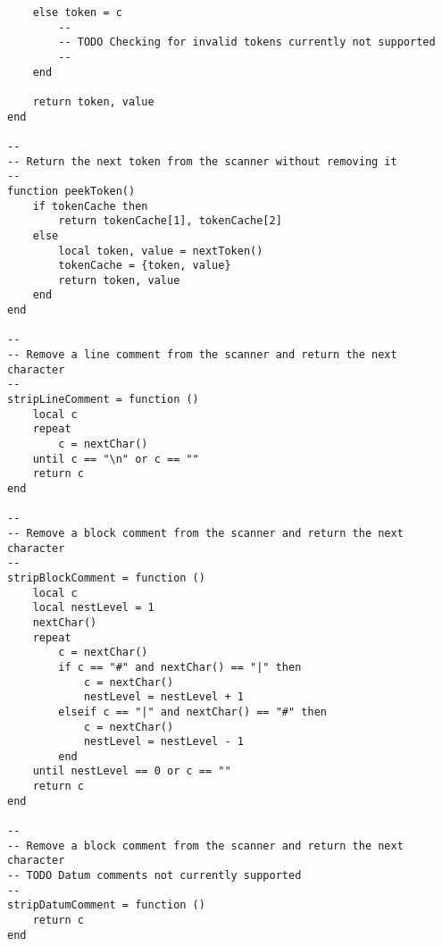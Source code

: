 \begin{verbatim}
    else token = c
        --
        -- TODO Checking for invalid tokens currently not supported
        --
    end

    return token, value
end

--
-- Return the next token from the scanner without removing it
--
function peekToken()
    if tokenCache then
        return tokenCache[1], tokenCache[2]
    else
        local token, value = nextToken()
        tokenCache = {token, value}
        return token, value
    end
end

--
-- Remove a line comment from the scanner and return the next character
--
stripLineComment = function ()
    local c
    repeat
        c = nextChar()
    until c == "\n" or c == ""
    return c
end

--
-- Remove a block comment from the scanner and return the next character
--
stripBlockComment = function ()
    local c
    local nestLevel = 1
    nextChar()
    repeat
        c = nextChar()
        if c == "#" and nextChar() == "|" then
            c = nextChar()
            nestLevel = nestLevel + 1
        elseif c == "|" and nextChar() == "#" then
            c = nextChar()
            nestLevel = nestLevel - 1
        end
    until nestLevel == 0 or c == ""
    return c
end

--
-- Remove a block comment from the scanner and return the next character
-- TODO Datum comments not currently supported
--
stripDatumComment = function ()
    return c
end
\end{verbatim}

